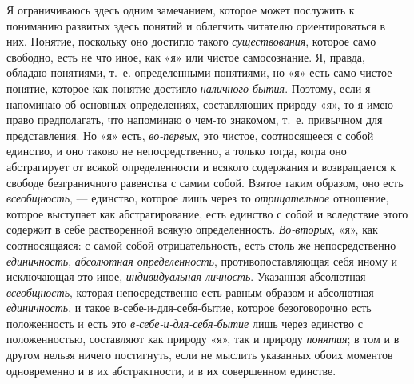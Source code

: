\documentclass[twoside]{article}
\begin{document}
{{Я ограничиваюсь здесь одним замечанием, которое может послужить к пониманию 
развитых здесь понятий и облегчить читателю ориентироваться в них. Понятие, 
поскольку оно достигло такого {\em существования}, которое само свободно, 
есть не что иное, как «я» или чистое самосознание. Я, правда, обладаю 
понятиями, т.~е. определенными понятиями, но «я» есть само чистое понятие, 
которое как понятие достигло {\em наличного бытия}. Поэтому, если я напоминаю 
об основных определениях, составляющих природу «я», то я имею право 
предполагать, что напоминаю о чем-то знакомом, т.~е. привычном для 
представления. Но «я» есть, {\em во-первых}, это чистое, соотносящееся с собой 
единство, и оно таково не непосредственно, а только тогда, когда оно 
абстрагирует от всякой определенности и всякого содержания и возвращается к 
свободе безграничного равенства с самим собой. Взятое таким образом, оно 
есть {\em всеобщность}, — единство, которое лишь через то {\em отрицательное}
отношение, которое выступает как абстрагирование, есть единство с собой и 
вследствие этого содержит в себе растворенной всякую определенность. {\em Во-вторых},
«я», как соотносящаяся: с самой собой отрицательность, есть столь же 
непосредственно {\em единичность}, {\em абсолютная определенность},
противопоставляющая себя иному и исключающая это иное, {\em индивидуальная личность}.
Указанная абсолютная {\em всеобщность}, которая непосредственно есть равным 
образом и абсолютная {\em единичность}, и такое в-себе-и-для-себя-бытие, 
которое безоговорочно есть положенность и есть это {\em в-себе-и-для-себя-бытие}
лишь через единство с положенностью, составляют как природу «я», так и 
природу {\em понятия}; в том и в другом нельзя ничего постигнуть, если не 
мыслить указанных обоих моментов одновременно и в их абстрактности, и в их
совершенном единстве.

}}
\end{document}
